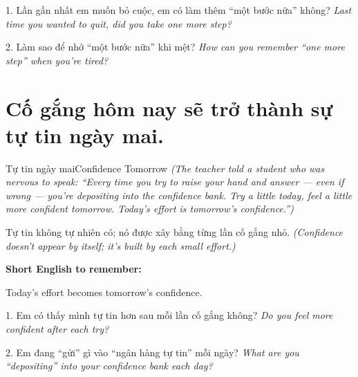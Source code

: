\begin{tuhocnhanh}
1. Lần gần nhất em muốn bỏ cuộc, em có làm thêm ``một bước nữa'' không? \textit{Last time you wanted to quit, did you take one more step?}

2. Làm sao để nhớ ``một bước nữa'' khi mệt? \textit{How can you remember ``one more step'' when you're tired?}
\end{tuhocnhanh}
\ngancach

\section{Cố gắng hôm nay sẽ trở thành sự tự tin ngày mai.}
\begin{truyen}{Tự tin ngày mai}{Confidence Tomorrow}
\textit{(The teacher told a student who was nervous to speak: ``Every time you try to raise your hand and answer — even if wrong — you're depositing into the confidence bank. Try a little today, feel a little more confident tomorrow. Today's effort is tomorrow's confidence.'')}
\end{truyen}

\begin{baihoc}
Tự tin không tự nhiên có; nó được xây bằng từng lần cố gắng nhỏ.
\textit{(Confidence doesn't appear by itself; it's built by each small effort.)}
\end{baihoc}

\begin{ghinhoanh}
\textbf{Short English to remember:}

Today's effort becomes tomorrow's confidence.

\end{ghinhoanh}

\begin{tuhocnhanh}
1. Em có thấy mình tự tin hơn sau mỗi lần cố gắng không? \textit{Do you feel more confident after each try?}

2. Em đang ``gửi'' gì vào ``ngân hàng tự tin'' mỗi ngày? \textit{What are you ``depositing'' into your confidence bank each day?}
\end{tuhocnhanh}
\ngancach
